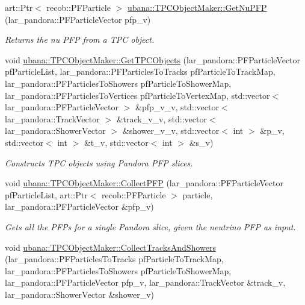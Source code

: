 \begin{DoxyCompactItemize}
\item 
art\-::\-Ptr$<$ recob\-::\-P\-F\-Particle $>$ \hyperlink{group__UBXSec_ga6a47470b5f5690a3626e14bc9f6f360c}{ubana\-::\-T\-P\-C\-Object\-Maker\-::\-Get\-Nu\-P\-F\-P} (lar\-\_\-pandora\-::\-P\-F\-Particle\-Vector pfp\-\_\-v)
\begin{DoxyCompactList}\small\item\em Returns the nu P\-F\-P from a T\-P\-C object. \end{DoxyCompactList}\item 
void \hyperlink{group__UBXSec_gab15442d6254937d3930ea046a93321b9}{ubana\-::\-T\-P\-C\-Object\-Maker\-::\-Get\-T\-P\-C\-Objects} (lar\-\_\-pandora\-::\-P\-F\-Particle\-Vector pf\-Particle\-List, lar\-\_\-pandora\-::\-P\-F\-Particles\-To\-Tracks pf\-Particle\-To\-Track\-Map, lar\-\_\-pandora\-::\-P\-F\-Particles\-To\-Showers pf\-Particle\-To\-Shower\-Map, lar\-\_\-pandora\-::\-P\-F\-Particles\-To\-Vertices pf\-Particle\-To\-Vertex\-Map, std\-::vector$<$ lar\-\_\-pandora\-::\-P\-F\-Particle\-Vector $>$ \&pfp\-\_\-v\-\_\-v, std\-::vector$<$ lar\-\_\-pandora\-::\-Track\-Vector $>$ \&track\-\_\-v\-\_\-v, std\-::vector$<$ lar\-\_\-pandora\-::\-Shower\-Vector $>$ \&shower\-\_\-v\-\_\-v, std\-::vector$<$ int $>$ \&p\-\_\-v, std\-::vector$<$ int $>$ \&t\-\_\-v, std\-::vector$<$ int $>$ \&s\-\_\-v)
\begin{DoxyCompactList}\small\item\em Constructs T\-P\-C objects using Pandora P\-F\-P slices. \end{DoxyCompactList}\item 
void \hyperlink{group__UBXSec_ga9572bb5f180624d28ed9055591d633eb}{ubana\-::\-T\-P\-C\-Object\-Maker\-::\-Collect\-P\-F\-P} (lar\-\_\-pandora\-::\-P\-F\-Particle\-Vector pf\-Particle\-List, art\-::\-Ptr$<$ recob\-::\-P\-F\-Particle $>$ particle, lar\-\_\-pandora\-::\-P\-F\-Particle\-Vector \&pfp\-\_\-v)
\begin{DoxyCompactList}\small\item\em Gets all the P\-F\-Ps for a single Pandora slice, given the neutrino P\-F\-P as input. \end{DoxyCompactList}\item 
void \hyperlink{group__UBXSec_ga4742f34e12ae8d756648f606123fe810}{ubana\-::\-T\-P\-C\-Object\-Maker\-::\-Collect\-Tracks\-And\-Showers} (lar\-\_\-pandora\-::\-P\-F\-Particles\-To\-Tracks pf\-Particle\-To\-Track\-Map, lar\-\_\-pandora\-::\-P\-F\-Particles\-To\-Showers pf\-Particle\-To\-Shower\-Map, lar\-\_\-pandora\-::\-P\-F\-Particle\-Vector pfp\-\_\-v, lar\-\_\-pandora\-::\-Track\-Vector \&track\-\_\-v, lar\-\_\-pandora\-::\-Shower\-Vector \&shower\-\_\-v)

\end{DoxyCompactItemize}

